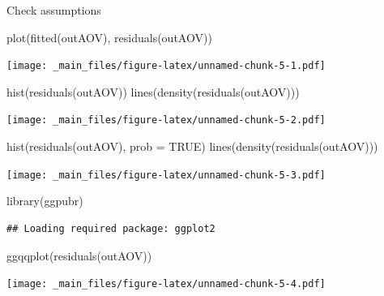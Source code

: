 \documentclass[
]{book}
\newenvironment{Shaded}{\begin{snugshade}}{\end{snugshade}}
\newcommand{\AttributeTok}[1]{\textcolor[rgb]{0.77,0.63,0.00}{#1}}
\newcommand{\ConstantTok}[1]{\textcolor[rgb]{0.00,0.00,0.00}{#1}}
\newcommand{\FunctionTok}[1]{\textcolor[rgb]{0.00,0.00,0.00}{#1}}
\newcommand{\NormalTok}[1]{#1}
\theoremstyle{definition}
\theoremstyle{definition}
\theoremstyle{definition}
\theoremstyle{definition}
\theoremstyle{remark}
\begin{document}
Check assumptions

\begin{Shaded}
\begin{Highlighting}[]
\FunctionTok{plot}\NormalTok{(}\FunctionTok{fitted}\NormalTok{(outAOV), }\FunctionTok{residuals}\NormalTok{(outAOV))}
\end{Highlighting}
\end{Shaded}

\texttt{[image: \_main\_files/figure-latex/unnamed-chunk-5-1.pdf]}

\begin{Shaded}
\begin{Highlighting}[]
\FunctionTok{hist}\NormalTok{(}\FunctionTok{residuals}\NormalTok{(outAOV))}
\FunctionTok{lines}\NormalTok{(}\FunctionTok{density}\NormalTok{(}\FunctionTok{residuals}\NormalTok{(outAOV)))}
\end{Highlighting}
\end{Shaded}

\texttt{[image: \_main\_files/figure-latex/unnamed-chunk-5-2.pdf]}

\begin{Shaded}
\begin{Highlighting}[]
\FunctionTok{hist}\NormalTok{(}\FunctionTok{residuals}\NormalTok{(outAOV), }\AttributeTok{prob =} \ConstantTok{TRUE}\NormalTok{)}
\FunctionTok{lines}\NormalTok{(}\FunctionTok{density}\NormalTok{(}\FunctionTok{residuals}\NormalTok{(outAOV)))}
\end{Highlighting}
\end{Shaded}

\texttt{[image: \_main\_files/figure-latex/unnamed-chunk-5-3.pdf]}

\begin{Shaded}
\begin{Highlighting}[]
\FunctionTok{library}\NormalTok{(ggpubr)}
\end{Highlighting}
\end{Shaded}

\begin{verbatim}
## Loading required package: ggplot2
\end{verbatim}

\begin{Shaded}
\begin{Highlighting}[]
\FunctionTok{ggqqplot}\NormalTok{(}\FunctionTok{residuals}\NormalTok{(outAOV))}
\end{Highlighting}
\end{Shaded}

\texttt{[image: \_main\_files/figure-latex/unnamed-chunk-5-4.pdf]}
\end{document}

